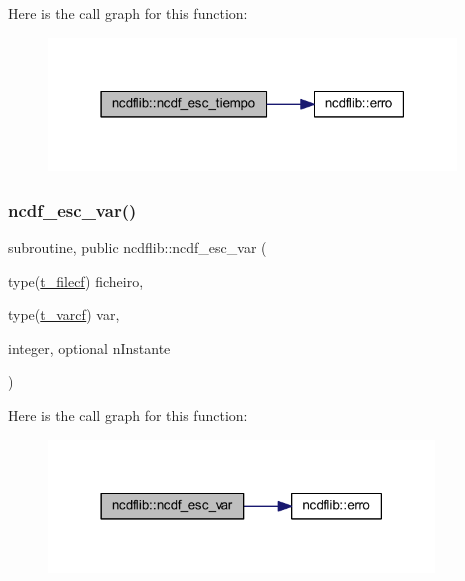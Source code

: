 Here is the call graph for this function\+:\nopagebreak
\begin{figure}[H]
\begin{center}
\leavevmode
\includegraphics[width=307pt]{namespacencdflib_a70418482c5ffef91933942850702610f_cgraph}
\end{center}
\end{figure}
\mbox{\label{namespacencdflib_a948c992e922b3d6f18e5f3bbb27b5266}} 
\subsubsection{\texorpdfstring{ncdf\+\_\+esc\+\_\+var()}{ncdf\_esc\_var()}}
{\footnotesize\ttfamily subroutine, public ncdflib\+::ncdf\+\_\+esc\+\_\+var (\begin{DoxyParamCaption}\item[{type(\mbox{\hyperlink{structncdflib_1_1t__filecf}{t\+\_\+filecf}})}]{ficheiro,  }\item[{type(\mbox{\hyperlink{structncdflib_1_1t__varcf}{t\+\_\+varcf}})}]{var,  }\item[{integer, optional}]{n\+Instante }\end{DoxyParamCaption})}

Here is the call graph for this function\+:\nopagebreak
\begin{figure}[H]
\begin{center}
\leavevmode
\includegraphics[width=290pt]{namespacencdflib_a948c992e922b3d6f18e5f3bbb27b5266_cgraph}
\end{center}
\end{figure}
\mbox{\label{namespacencdflib_acbe4ff328732b4674512c190b8c2d5b5}} 
